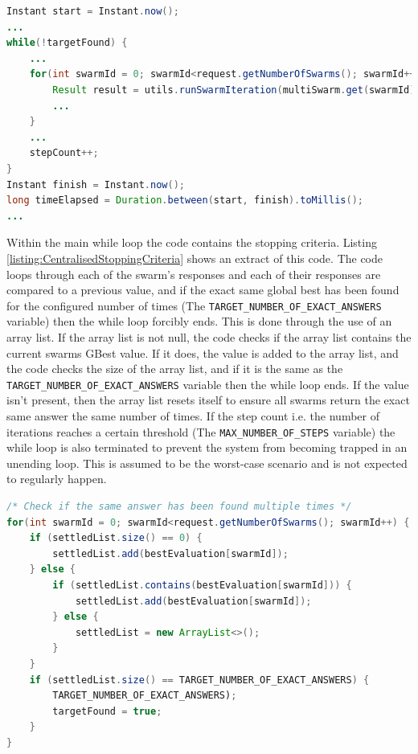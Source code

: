 \documentclass[oneside,12pt]{book}
\begin{document}
\begin{lstlisting}[basicstyle=\footnotesize, language=Java]
Instant start = Instant.now();
...
while(!targetFound) {
    ...
    for(int swarmId = 0; swarmId<request.getNumberOfSwarms(); swarmId++) {
        Result result = utils.runSwarmIteration(multiSwarm.get(swarmId), stepCount);
        ...
    }
    ...
    stepCount++;
}
Instant finish = Instant.now();
long timeElapsed = Duration.between(start, finish).toMillis();
...
\end{lstlisting}
\label{listing:CentralisedIterationMethod}

Within the main while loop the code contains the stopping criteria. Listing \ref{listing:CentralisedStoppingCriteria} shows an extract of this code. The code loops through each of the swarm's responses and each of their responses are compared to a previous value, and if the exact same global best has been found for the configured number of times (The \verb|TARGET_NUMBER_OF_EXACT_ANSWERS| variable) then the while loop forcibly ends. This is done through the use of an array list. If the array list is not null, the code checks if the array list contains the current swarms GBest value. If it does, the value is added to the array list, and the code checks the size of the array list, and if it is the same as the \verb|TARGET_NUMBER_OF_EXACT_ANSWERS| variable then the while loop ends. If the value isn't present, then the array list resets itself to ensure all swarms return the exact same answer the same number of times. If the step count i.e. the number of iterations reaches a certain threshold (The \verb|MAX_NUMBER_OF_STEPS| variable) the while loop is also terminated to prevent the system from becoming trapped in an unending loop. This is assumed to be the worst-case scenario and is not expected to regularly happen. 

\begin{lstlisting}[basicstyle=\footnotesize, language=Java]
/* Check if the same answer has been found multiple times */
for(int swarmId = 0; swarmId<request.getNumberOfSwarms(); swarmId++) {
    if (settledList.size() == 0) {
        settledList.add(bestEvaluation[swarmId]);
    } else {
        if (settledList.contains(bestEvaluation[swarmId])) {
            settledList.add(bestEvaluation[swarmId]);
        } else {
            settledList = new ArrayList<>();
        }
    }
    if (settledList.size() == TARGET_NUMBER_OF_EXACT_ANSWERS) {
        TARGET_NUMBER_OF_EXACT_ANSWERS);
        targetFound = true;
    }
}
\end{lstlisting}
\label{listing:CentralisedStoppingCriteria}
\end{document}
